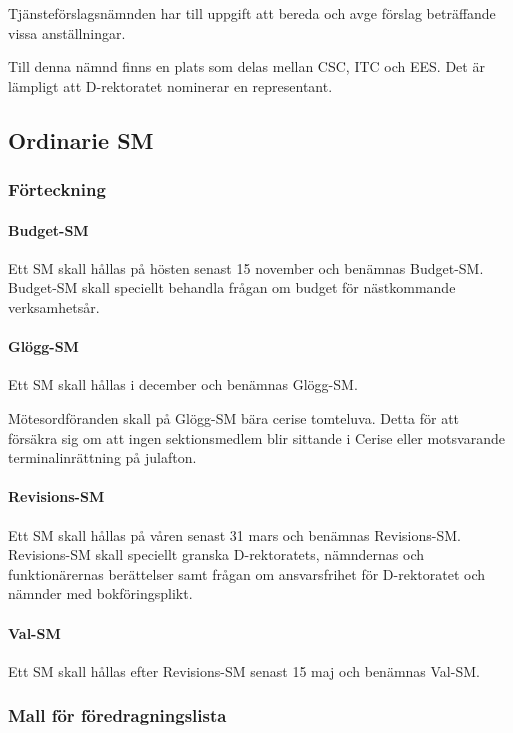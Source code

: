 \documentclass[a4paper,12pt]{article}
\begin{document}
Tjänsteförslagsnämnden har till uppgift att bereda och avge förslag beträffande vissa anställningar.

Till denna nämnd finns en plats som delas mellan CSC, ITC och EES. Det är lämpligt att D-rektoratet nominerar en representant.

\subsection{Ordinarie SM}

\subsubsection{Förteckning}

\paragraph{Budget-SM}

Ett SM skall hållas på hösten senast 15 november och benämnas Budget-SM. Budget-SM skall speciellt behandla frågan om budget för nästkommande verksamhetsår.

\paragraph{Glögg-SM}

Ett SM skall hållas i december och benämnas Glögg-SM.

Mötesordföranden skall på Glögg-SM bära cerise tomteluva. Detta för att försäkra sig om att ingen sektionsmedlem blir sittande i Cerise eller motsvarande terminalinrättning på julafton.

\paragraph{Revisions-SM}

Ett SM skall hållas på våren senast 31 mars och benämnas Revisions-SM. Revisions-SM skall speciellt granska D-rektoratets, nämndernas och funktionärernas berättelser samt frågan om ansvarsfrihet för D-rektoratet och nämnder med bokföringsplikt.

\paragraph{Val-SM}

Ett SM skall hållas efter Revisions-SM senast 15 maj och benämnas Val-SM.

\subsubsection{Mall för föredragningslista}
\end{document}
